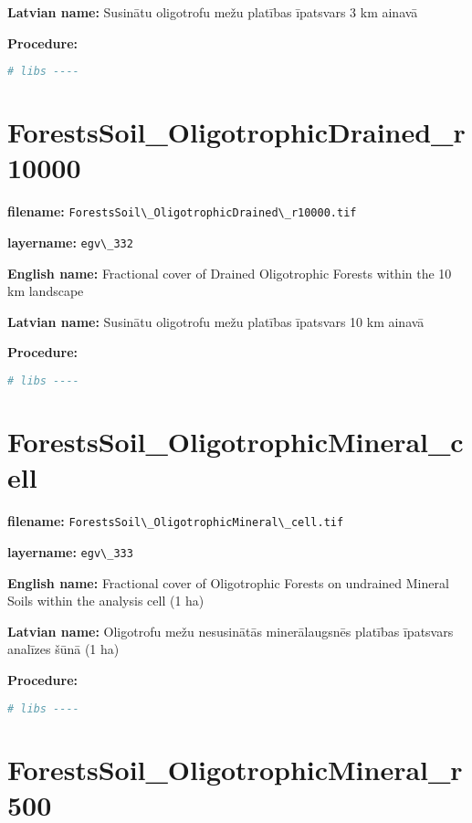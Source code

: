 \documentclass[
]{book}
\newcommand{\passthrough}[1]{#1}
\begin{document}
\textbf{Latvian name:} Susinātu oligotrofu mežu platības īpatsvars 3 km ainavā

\textbf{Procedure:}

\begin{lstlisting}[language=R]
# libs ----
\end{lstlisting}

\section{ForestsSoil\_OligotrophicDrained\_r10000}\label{ch06.332}

\textbf{filename:} \passthrough{\lstinline!ForestsSoil\_OligotrophicDrained\_r10000.tif!}

\textbf{layername:} \passthrough{\lstinline!egv\_332!}

\textbf{English name:} Fractional cover of Drained Oligotrophic Forests within the 10 km landscape

\textbf{Latvian name:} Susinātu oligotrofu mežu platības īpatsvars 10 km ainavā

\textbf{Procedure:}

\begin{lstlisting}[language=R]
# libs ----
\end{lstlisting}

\section{ForestsSoil\_OligotrophicMineral\_cell}\label{ch06.333}

\textbf{filename:} \passthrough{\lstinline!ForestsSoil\_OligotrophicMineral\_cell.tif!}

\textbf{layername:} \passthrough{\lstinline!egv\_333!}

\textbf{English name:} Fractional cover of Oligotrophic Forests on undrained Mineral Soils within the analysis cell (1 ha)

\textbf{Latvian name:} Oligotrofu mežu nesusinātās minerālaugsnēs platības īpatsvars analīzes šūnā (1 ha)

\textbf{Procedure:}

\begin{lstlisting}[language=R]
# libs ----
\end{lstlisting}

\section{ForestsSoil\_OligotrophicMineral\_r500}\label{ch06.334}
\end{document}
